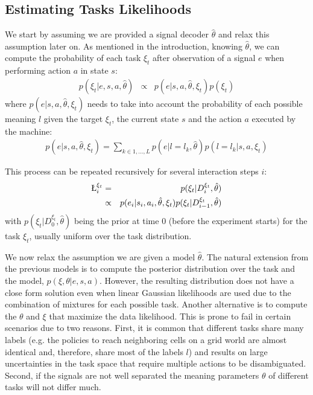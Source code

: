 \subsection{Estimating Tasks Likelihoods}

We start by assuming we are provided a signal decoder $\hat{\theta}$ and relax this assumption later on.
%
As mentioned in the introduction, knowing $\hat{\theta}$, we can compute the probability of each task $\xi_t$ after observation of a signal $e$ when performing action $a$ in state $s$:
%
\begin{eqnarray}
p(\xi_t|e, s, a, \hat{\theta}) & \propto & p(e |s, a, \hat{\theta}, \xi_t) p(\xi_t)
\label{eq:1}
\end{eqnarray}
%
where  $p(e |s, a, \hat{\theta}, \xi_t)$ needs to take into account the probability of each possible meaning $l$ given the target $\xi_t$, the current state $s$ and the action $a$ executed by the machine:
%
\begin{eqnarray}
p(e |s, a, \hat{\theta}, \xi_t) =  \sum_{k \in {1, \ldots, L}} p(e |l = l_k, \hat{\theta}) p(l = l_k| s, a, \xi_t)
\end{eqnarray}

This process can be repeated recursively for several interaction steps $i$:
%
\begin{eqnarray}
\L_i^{\xi_t} & = & p(\xi_t|D_i^{\xi_t}, \hat{\theta}) \nonumber \\
& \propto & p(e_i |s_i, a_i, \hat{\theta},\xi_t) p(\xi_t|D_{i-1}^{\xi_t}, \hat{\theta})
\label{eq:filter}
\end{eqnarray}
%
with $p(\xi_t|D_0^{\xi_t}, \hat{\theta})$ being the prior at time 0 (before the experiment starts) for the task $\xi_t$, usually uniform over the task distribution. 

We now relax the assumption we are given a model $\hat{\theta}$. The natural extension from the previous models is to compute the posterior distribution over the task and the model, $p(\xi, \theta |e, s, a)$. However, the resulting distribution does not have a close form solution even when linear Gaussian likelihoods are used due to the combination of mixtures for each possible task. Another alternative is to compute the $\theta$ and $\xi$ that maximize the data likelihood. This is prone to fail in certain scenarios due to two reasons. First, it is common that different tasks share many labels (e.g. the policies to reach neighboring cells on a grid world are almost identical and, therefore, share most of the labels $l$) and results on large uncertainties in the task space that require multiple actions to be disambiguated. Second, if the signals are not well separated the meaning parameters $\theta$ of different tasks will not differ much.  


